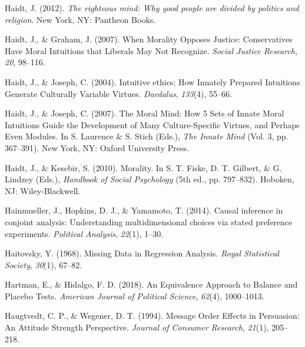 \documentclass[12pt,econ]{sources/authesis}
\newenvironment{CSLReferences}%
  {}%
  {\par}
\begin{document}
\begin{CSLReferences}{1}{0}
\leavevmode{}%
Haidt, J. (2012). \emph{The righteous mind: Why good people are divided by politics and religion}. New York, NY: Pantheon Books.

\leavevmode{}%
Haidt, J., \& Graham, J. (2007). {When Morality Opposes Justice: Conservatives Have Moral Intuitions that Liberals May Not Recognize}. \emph{Social Justice Research}, \emph{20}, 98--116.

\leavevmode{}%
Haidt, J., \& Joseph, C. (2004). {Intuitive ethics: How Innately Prepared Intuitions Generate Culturally Variable Virtues}. \emph{Daedalus}, \emph{133}(4), 55--66.

\leavevmode{}%
Haidt, J., \& Joseph, C. (2007). {The Moral Mind: How 5 Sets of Innate Moral Intuitions Guide the Development of Many Culture-Specific Virtues, and Perhaps Even Modules}. In S. Laurence \& S. Stich (Eds.), \emph{{The Innate Mind}} (Vol. 3, pp. 367--391). New York, NY: Oxford University Press.

\leavevmode{}%
Haidt, J., \& Kesebir, S. (2010). {Morality}. In S. T. Fiske, D. T. Gilbert, \& G. Lindzey (Eds.), \emph{{Handbook of Social Psychology}} (5th ed., pp. 797--832). Hoboken, NJ: Wiley-Blackwell.

\leavevmode{}%
Hainmueller, J., Hopkins, D. J., \& Yamamoto, T. (2014). Causal inference in conjoint analysis: Understanding multidimensional choices via stated preference experiments. \emph{Political Analysis}, \emph{22}(1), 1--30.

\leavevmode{}%
Haitovsky, Y. (1968). {Missing Data in Regression Analysis}. \emph{Royal Statistical Society}, \emph{30}(1), 67--82.

\leavevmode{}%
Hartman, E., \& Hidalgo, F. D. (2018). {An Equivalence Approach to Balance and Placebo Tests}. \emph{American Journal of Political Science}, \emph{62}(4), 1000--1013.

\leavevmode{}%
Haugtvedt, C. P., \& Wegener, D. T. (1994). {Message Order Effects in Persuasion: An Attitude Strength Perspective}. \emph{Journal of Consumer Research}, \emph{21}(1), 205--218.


\end{CSLReferences}
\end{document}
